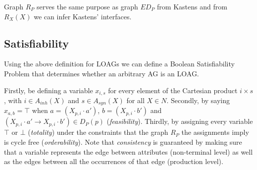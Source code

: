 Graph $R_P$ serves the same purpose as graph $ED_P$ from Kastens and from $R_X(X)$
we can infer Kastens' interfaces\cite{kastens80}.

\subsection{Satisfiability}

Using the above definition for LOAGs we can define a Boolean Satisfiability 
Problem that determines whether an arbitrary AG is an LOAG.

Firstly, be defining a variable $x_{i,s}$ for every element of the Cartesian
product $i \times s$, with $i \in A_{inh}(X)$ and $s \in A_{syn}(X)$ for all
$X\in N$. Secondly, by saying $x_{a,b} =\top$ when $a = (X_{p,i}\cdot a')$,
$b = (X_{p,i}\cdot b')$ and $(X_{p,i}\cdot a'\rightarrow X_{p,i}\cdot b')\in D_P(p)$
(\emph{feasibility}).
Thirdly, by assigning every variable $\top$ or $\bot$ (\emph{totality}) under 
the constraints that the graph $R_P$ the assignments imply is cycle free
(\emph{orderability}).
Note that \emph{consistency} is guaranteed by making sure that a variable
represents the edge between attributes (non-terminal level) as well as the edges 
between all the occurrences of that edge (production level).


